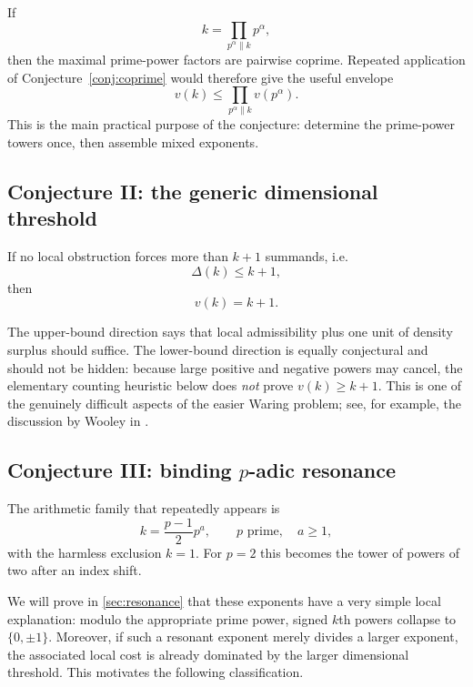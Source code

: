 \documentclass[../Axiomathic.tex]{subfiles}
\begin{document}
If
\[
  k=\prod_{p^\alpha\parallel k}p^\alpha,
\]
then the maximal prime-power factors are pairwise coprime.  Repeated application of Conjecture~\ref{conj:coprime} would therefore give the useful envelope
\begin{equation}\label{eq:prime-power-envelope}
  \boxed{v(k)\le\prod_{p^\alpha\parallel k}v(p^\alpha).}
\end{equation}
This is the main practical purpose of the conjecture: determine the prime-power towers once, then assemble mixed exponents.

\subsection{Conjecture II: the generic dimensional threshold}

\begin{conj}\label{conj:generic}
If no local obstruction forces more than $k+1$ summands, i.e.
\[
  \Delta(k)\le k+1,
\]
then
\begin{equation}\label{eq:generic-v}
  \boxed{v(k)=k+1.}
\end{equation}
\end{conj}

The upper-bound direction says that local admissibility plus one unit of density surplus should suffice.  The lower-bound direction is equally conjectural and should not be hidden: because large positive and negative powers may cancel, the elementary counting heuristic below does \emph{not} prove $v(k)\ge k+1$.  This is one of the genuinely difficult aspects of the easier Waring problem; see, for example, the discussion by Wooley in \cite{BukhMO}.

\subsection{Conjecture III: binding $p$-adic resonance}

The arithmetic family that repeatedly appears is
\begin{equation}\label{eq:resonance-family}
  k=\frac{p-1}{2}p^a,
  \qquad p\text{ prime},\quad a\ge1,
\end{equation}
with the harmless exclusion $k=1$.  For $p=2$ this becomes the tower of powers of two after an index shift.

We will prove in \cref{sec:resonance} that these exponents have a very simple local explanation: modulo the appropriate prime power, signed $k$th powers collapse to $\{0,\pm1\}$.  Moreover, if such a resonant exponent merely divides a larger exponent, the associated local cost is already dominated by the larger dimensional threshold.  This motivates the following classification.
\end{document}
